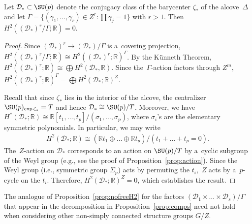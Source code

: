 \begin{Proposition}
\label{prop:nofreeH2}
Let $\mathcal{D}_* \subset \SU(p)$ denote the conjugacy class of the barycenter $\zeta_* $ of the alcove~$\Delta$ and
let $\Gamma = \{(\gamma_1, \ldots, \gamma_r) \in Z^r \colon \prod \gamma_j =1 \}$ with $r>1$.
Then $H^2((\mathcal{D}_*)^r/\Gamma;{\mathbb{R}})=0$.
\end{Proposition}
\begin{proof}
Since $(\mathcal{D}_*)^r \to (\mathcal{D}_*)/\Gamma$ is a~covering projection,
$H^2((\mathcal{D}_*)^r/\Gamma;{\mathbb{R}}) \cong H^2 ((\mathcal{D}_*)^r; {\mathbb{R}})^\Gamma$.
By the K\"unneth Theorem, $H^2((\mathcal{D}_*)^r;{\mathbb{R}}) \cong \bigoplus H^2(\mathcal{D}_*,{\mathbb{R}})$.
Since the~$\Gamma$-action factors through $Z^m$, $H^2 ((\mathcal{D}_*)^r; {\mathbb{R}})^\Gamma = \bigoplus
H^2(\mathcal{D}_*;{\mathbb{R}})^Z$.

Recall that since $\zeta_*$ lies in the interior of the alcove, the centralizer $\SU(p)_{\exp \zeta_*} = T$ and hence
$\mathcal{D}_* \cong \SU(p)/T$.
Moreover, we have $H^*(\mathcal{D}_*;{\mathbb{R}})\cong {\mathbb{R}}[t_1, \ldots, t_p]/(\sigma_1, \ldots, \sigma_p)$,
where $\sigma_i$'s are the elementary symmetric polynomials.
In particular, we may write
\begin{gather*}
H^2(\mathcal{D}_*;{\mathbb{R}}) \cong ({\mathbb{R}} t_1 \oplus \dots \oplus {\mathbb{R}} t_p)/(t_1+ \dots + t_p=0).
\end{gather*}
The~$Z$-action on $\mathcal{D}_*$ corresponds to an action on $\SU(p)/T$ by a~cyclic subgroup of the Weyl group (e.g.,
see the proof of Proposition~\ref{prop:action}).
Since the Weyl group (i.e., symmetric group $\Sigma_p$) acts by permuting the $t_i$,~$Z$ acts by a~$p$-cycle on the $t_i$.
Therefore, $H^2(\mathcal{D}_*;{\mathbb{R}})^Z=0$, which establishes the result.
\end{proof}

\begin{Remark}
\label{remark:lament}
The analogue of Proposition~\ref{prop:nofreeH2} for the factors $(\mathcal{D}_1 \times \dots \times
\mathcal{D}_s)/\Gamma$ that appear in the decomposition in Proposition~\ref{prop:comps} need not hold when considering
other non-simply connected structure groups $G/Z$.
\end{Remark}

